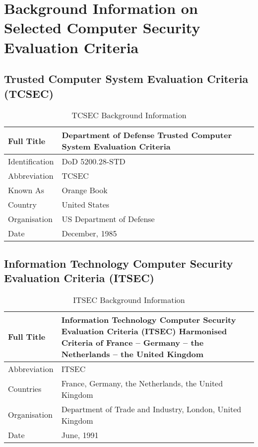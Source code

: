 \chapter{Background Information on Selected Computer Security Evaluation Criteria}

\section{Trusted Computer System Evaluation Criteria (TCSEC)}

        \begin{table}[H]
        \begin{center}
        \begin{tabular}{|>{\sffamily}p{2cm}|>{\sffamily}p{12cm}|} \hline
        Full Title      &   Department of Defense Trusted Computer
                            System Evaluation Criteria \\ \hline
        Identification  &   DoD 5200.28-STD \\ \hline
        Abbreviation    &   TCSEC \\ \hline
        Known As        &   Orange Book \\ \hline
        Country         &   United States \\ \hline
        Organisation    &   US Department of Defense \\ \hline
        Date            &   December, 1985 \\ \hline
        \end{tabular}
        \end{center}
        \caption{TCSEC Background Information}
        \end{table}

\section{Information Technology Computer Security
                                    Evaluation Criteria (ITSEC)}
        \begin{table}[H]
        \begin{center}
        \begin{tabular}{|>{\sffamily}p{2cm}|>{\sffamily}p{12cm}|} \hline
        Full Title      & Information Technology Computer Security
                          Evaluation Criteria (ITSEC) 
                          Harmonised Criteria of France -- Germany --
                          the Netherlands -- the United Kingdom \\ \hline
        Abbreviation    & ITSEC \\ \hline
        Countries       & France, Germany, the Netherlands, 
                          the United Kingdom \\ \hline
        Organisation    & Department of Trade and Industry, London, United
                          Kingdom \\ \hline
        Date            & June, 1991 \\ \hline
        \end{tabular}
        \end{center}
        \caption{ITSEC Background Information}
        \end{table}

